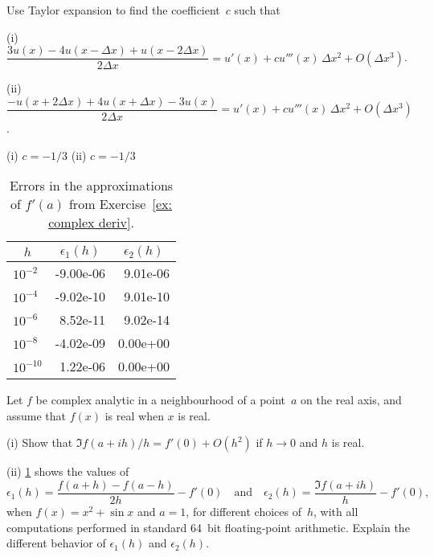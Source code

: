 \begin{Exercises}
\exercise
Use Taylor expansion to find the coefficient~$c$ such that
\begin{description}
\item{(i)} $\dfrac{3u(x)-4u(x-\Delta x)+u(x-2\Delta x)}{2\Delta x}
=u'(x)+cu'''(x)\,\Delta x^2+O(\Delta x^3)$.
\item{(ii)} $\dfrac{-u(x+2\Delta x)+4u(x+\Delta x)-3u(x)}{2\Delta x}
=u'(x)+cu'''(x)\,\Delta x^2+O(\Delta x^3)$.
\end{description}
\begin{ans}
(i) $c=-1/3$ \quad(ii) $c=-1/3$
\end{ans}

\begin{table}
\caption{Errors in the approximations of $f'(a)$ from 
Exercise~\ref{ex: complex deriv}.}
\label{tab: complex deriv}
\begin{center}
\renewcommand{\arraystretch}{1.2}
\ttfamily
\begin{tabular}{lrr}
\multicolumn{1}{c}{$h$}&
\multicolumn{1}{c}{$\epsilon_1(h)$}&
\multicolumn{1}{c}{$\epsilon_2(h)$}\\
\hline
$10^{-2}$ &-9.00e-06&9.01e-06\\
$10^{-4}$ &-9.02e-10&9.01e-10\\
$10^{-6}$ & 8.52e-11&9.02e-14\\
$10^{-8}$ &-4.02e-09&0.00e+00\\
$10^{-10}$& 1.22e-06&0.00e+00
\end{tabular}
\end{center}
\end{table}

\exercise\label{ex: complex deriv} 
Let $f$ be complex analytic in a neighbourhood of a point~$a$ on the real axis, 
and assume that $f(x)$ is real when $x$ is real.
\begin{description}
\item{(i)} Show that $\Im f(a+ih)/h=f'(0)+O(h^2)$ if $h\to0$ and $h$ is real.
\item{(ii)} \cref{tab: complex deriv} shows the values of
\[
\epsilon_1(h)=\frac{f(a+h)-f(a-h)}{2h}-f'(0)
\quad\text{and}\quad
\epsilon_2(h)=\frac{\Im f(a+ih)}{h}-f'(0),
\]
when $f(x)=x^2+\sin x$ and $a=1$, for different choices of~$h$, with all 
computations performed in standard 64~bit floating-point arithmetic.  Explain 
the different behavior of $\epsilon_1(h)$ and $\epsilon_2(h)$.
\end{description}


\end{Exercises}
